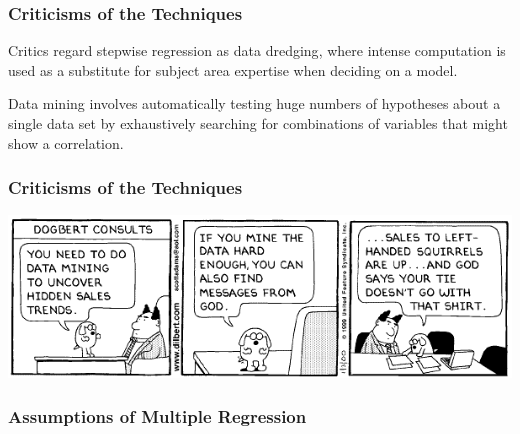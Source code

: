 \documentclass[handout]{beamer}
\newcommand{\blue}[1]{\textcolor{blue2}{#1}}
\begin{document}
\begin{frame}[fragile]
\frametitle{Criticisms of the Techniques}

Critics regard stepwise regression as \blue{data dredging}, where intense computation is used as a substitute for subject area expertise when deciding on a model.  

\pause
\vspace{0.5cm}

\blue{Data mining} involves automatically testing huge numbers of hypotheses about a single data set by exhaustively searching for combinations of variables that might show a correlation.

\end{frame}


\begin{frame}[fragile]
\frametitle{Criticisms of the Techniques}
\begin{center}
\includegraphics[width=\textwidth]{figure/dilbert.png}
\end{center}
\end{frame}


\begin{frame}[fragile]
\frametitle{Assumptions of Multiple Regression}

%
%

\end{frame}
\end{document}
